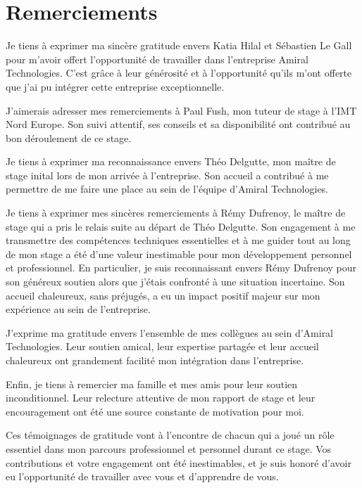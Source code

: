 \section*{Remerciements}
Je tiens à exprimer ma sincère gratitude envers Katia Hilal et Sébastien Le Gall pour m'avoir offert l'opportunité de travailler dans l'entreprise Amiral Technologies.
C'est grâce à leur générosité et à l'opportunité qu'ils m'ont offerte que j'ai pu intégrer cette entreprise exceptionnelle.

J'aimerais adresser mes remerciements à Paul Fush, mon tuteur de stage à l'IMT Nord Europe.
Son suivi attentif, ses conseils et sa disponibilité ont contribué au bon déroulement de ce stage.

Je tiens à exprimer ma reconnaissance envers Théo Delgutte, mon maître de stage inital lors de mon arrivée à l'entreprise.
Son accueil a contribué à me permettre de me faire une place au sein de l'équipe d'Amiral Technologies.

Je tiens à exprimer mes sincères remerciements à Rémy Dufrenoy, le maître de stage qui a pris le relais suite au départ de Théo Delgutte.
Son engagement à me transmettre des compétences techniques essentielles et à me guider tout au long de mon stage a été d'une valeur inestimable pour mon développement personnel et professionnel.
En particulier, je suis reconnaissant envers Rémy Dufrenoy pour son généreux soutien alors que j'étais confronté à une situation incertaine.
Son accueil chaleureux, sans préjugés, a eu un impact positif majeur sur mon expérience au sein de l'entreprise.

J'exprime ma gratitude envers l'ensemble de mes collègues au sein d'Amiral Technologies.
Leur soutien amical, leur expertise partagée et leur accueil chaleureux ont grandement facilité mon intégration dans l'entreprise.

Enfin, je tiens à remercier ma famille et mes amis pour leur soutien inconditionnel.
Leur relecture attentive de mon rapport de stage et leur encouragement ont été une source constante de motivation pour moi.

Ces témoignages de gratitude vont à l'encontre de chacun qui a joué un rôle essentiel dans mon parcours professionnel et personnel durant ce stage.
Vos contributions et votre engagement ont été inestimables, et je suis honoré d'avoir eu l'opportunité de travailler avec vous et d'apprendre de vous.
